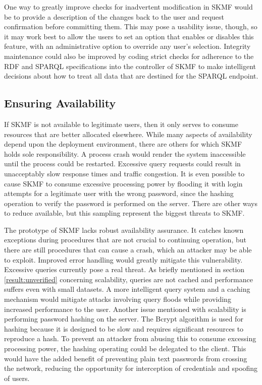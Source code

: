One way to greatly improve checks for inadvertent modification in SKMF would be to provide a description of the changes back to the user and request confirmation before committing them. This may pose a usability issue, though, so it may work best to allow the users to set an option that enables or disables this feature, with an administrative option to override any user's selection. Integrity maintenance could also be improved by coding strict checks for adherence to the RDF and SPARQL specifications into the controller of SKMF to make intelligent decisions about how to treat all data that are destined for the SPARQL endpoint.


\subsection{Ensuring Availability}
\label{result:availability}

If SKMF is not available to legitimate users, then it only serves to consume resources that are better allocated elsewhere. While many aspects of availability depend upon the deployment environment, there are others for which SKMF holds sole responsibility. A process crash would render the system inaccessible until the process could be restarted. Excessive query requests could result in unacceptably slow response times and traffic congestion. It is even possible to cause SKMF to consume excessive processing power by flooding it with login attempts for a legitimate user with the wrong password, since the hashing operation to verify the password is performed on the server. There are other ways to reduce available, but this sampling represent the biggest threats to SKMF.

The prototype of SKMF lacks robust availability assurance. It catches known exceptions during procedures that are not crucial to continuing operation, but there are still procedures that can cause a crash, which an attacker may be able to exploit. Improved error handling would greatly mitigate this vulnerability. Excessive queries currently pose a real threat. As briefly mentioned in section
\ref{result:unverified}
concerning scalability, queries are not cached and performance suffers even with small datasets. A more intelligent query system and a caching mechanism would mitigate attacks involving query floods while providing increased performance to the user. Another issue mentioned with scalability is performing password hashing on the server. The Bcrypt algorithm is used for hashing because it is designed to be slow and requires significant resources to reproduce a hash. To prevent an attacker from abusing this to consume excessing processing power, the hashing operating could be delegated to the client. This would have the added benefit of preventing plain text passwords from crossing the network, reducing the opportunity for interception of credentials and spoofing of users.
